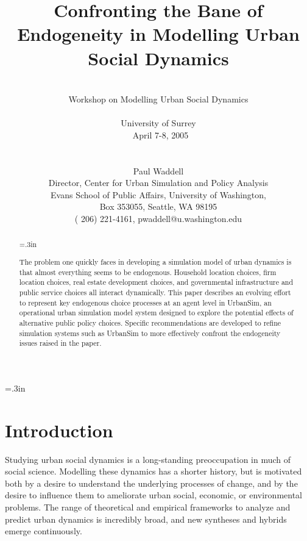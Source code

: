 \documentclass[12pt,a4paper]{article}
\begin{document}
\title{Confronting the Bane of Endogeneity in Modelling Urban Social Dynamics}

\author{\\
Workshop on Modelling Urban Social Dynamics\\\\
University of Surrey\\\
April 7-8, 2005\\
\\\\
Paul Waddell\\
Director, Center for Urban Simulation and Policy Analysis\\
Evans School of Public Affairs, University of Washington,\\
Box 353055, Seattle, WA 98195 \\
( 206) 221-4161, pwaddell@u.washington.edu} \maketitle


\baselineskip=.3in

\begin{abstract}
\baselineskip=.3in

The problem one quickly faces in developing a simulation model of
urban dynamics is that almost everything seems to be endogenous.
Household location choices, firm location choices, real estate
development choices, and governmental infrastructure and public
service choices all interact dynamically.  This paper describes an
evolving effort to represent key endogenous choice processes at an
agent level in UrbanSim, an operational urban simulation model
system designed to explore the potential effects of alternative
public policy choices.  Specific recommendations are developed to
refine simulation systems such as UrbanSim to more effectively
confront the endogeneity issues raised in the paper.
\end{abstract}
\clearpage

\section{Introduction}
Studying urban social dynamics is a long-standing preoccupation in
much of social science.  Modelling these dynamics has a shorter
history, but is motivated both by a desire to understand the
underlying processes of change, and by the desire to influence
them to ameliorate urban social, economic, or environmental
problems.  The range of theoretical and empirical frameworks to
analyze and predict urban dynamics is incredibly broad, and new
syntheses and hybrids emerge continuously.
\end{document}
